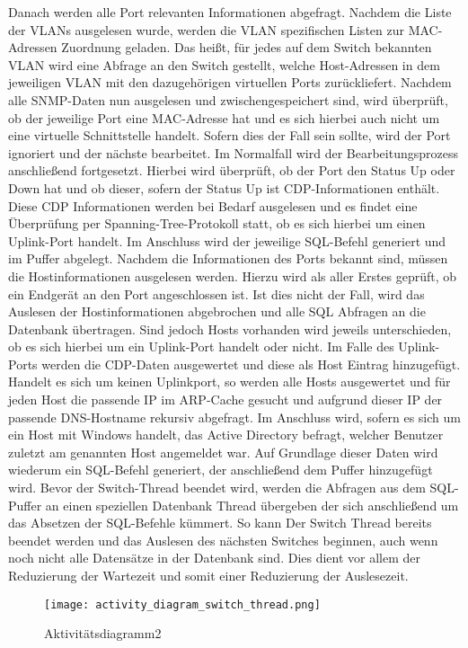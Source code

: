 Danach werden alle Port relevanten Informationen abgefragt. 
Nachdem die Liste der VLANs ausgelesen wurde, werden die VLAN spezifischen Listen zur MAC-Adressen Zuordnung geladen. Das heißt, für jedes auf dem Switch bekannten VLAN wird eine Abfrage an den Switch gestellt, welche Host-Adressen in dem jeweiligen VLAN mit den dazugehörigen virtuellen Ports zurückliefert.
Nachdem alle SNMP-Daten nun ausgelesen und zwischengespeichert sind, wird überprüft, ob der jeweilige Port eine MAC-Adresse hat und es sich hierbei auch nicht um eine virtuelle Schnittstelle handelt. Sofern dies der Fall sein sollte, wird der Port ignoriert und der nächste bearbeitet. Im Normalfall wird der Bearbeitungsprozess anschließend fortgesetzt. Hierbei wird überprüft, ob der Port den Status Up oder Down hat und ob dieser, sofern der Status Up ist CDP-Informationen enthält.
Diese CDP Informationen werden bei Bedarf ausgelesen und es findet eine Überprüfung per Spanning-Tree-Protokoll statt, ob es sich hierbei um einen Uplink-Port handelt. Im Anschluss wird der jeweilige SQL-Befehl generiert und im Puffer abgelegt.
Nachdem die Informationen des Ports bekannt sind, müssen die Hostinformationen ausgelesen werden. Hierzu wird als aller Erstes geprüft, ob ein Endgerät an den Port angeschlossen ist. Ist dies nicht der Fall, wird das Auslesen der Hostinformationen abgebrochen und alle SQL Abfragen an die Datenbank übertragen. Sind jedoch Hosts vorhanden wird jeweils unterschieden, ob es sich hierbei um ein Uplink-Port handelt oder nicht. Im Falle des Uplink-Ports werden die CDP-Daten ausgewertet und diese als Host Eintrag hinzugefügt. Handelt es sich um keinen Uplinkport, so werden alle Hosts ausgewertet und für jeden Host die passende IP im ARP-Cache gesucht und aufgrund dieser IP der passende DNS-Hostname rekursiv abgefragt.
Im Anschluss wird, sofern es sich um ein Host mit Windows handelt, das Active Directory befragt, welcher Benutzer zuletzt am genannten Host angemeldet war. Auf Grundlage dieser Daten wird wiederum ein SQL-Befehl generiert, der anschließend dem Puffer hinzugefügt wird.
Bevor der Switch-Thread beendet wird, werden die Abfragen aus dem SQL-Puffer an einen speziellen Datenbank Thread übergeben der sich anschließend um das Absetzen der SQL-Befehle kümmert. So kann Der Switch Thread bereits beendet werden und das Auslesen des nächsten Switches beginnen, auch wenn noch nicht alle Datensätze in der Datenbank sind. Dies dient vor allem der Reduzierung der Wartezeit und somit einer Reduzierung der Auslesezeit.

\begin{figure}[H]
\centering
\texttt{[image: activity\_diagram\_switch\_thread.png]}
\caption{Aktivitätsdiagramm2}
\label{fig:activitydiagram2}
\end{figure}

